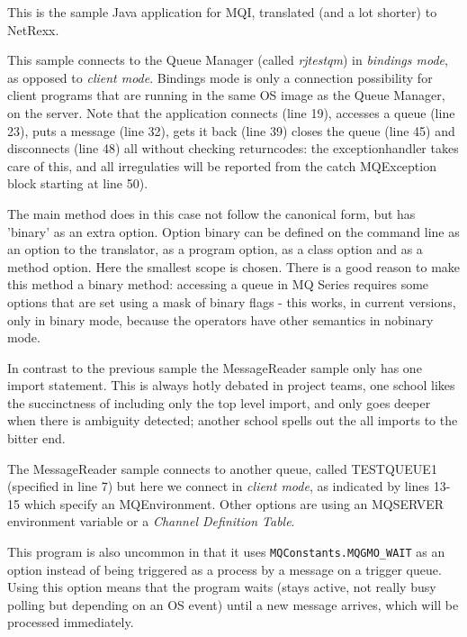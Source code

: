 {This is the sample Java application for MQI, translated (and a lot
shorter) to NetRexx.

This sample connects to the Queue Manager (called \emph{rjtestqm}) in
\emph{bindings mode}, as opposed to \emph{client mode}. Bindings mode
is only a connection possibility for client programs that are running
in the same OS image as the Queue Manager, on the server. Note that
the application connects (line 19), accesses a queue (line 23), puts a
message (line 32), gets it back (line 39) closes the queue (line 45) and disconnects (line 48) all without checking
returncodes: the exceptionhandler takes care of this, and all
irregulaties will be reported from the catch MQException block
starting at line 50).

The main method does in this case not follow the canonical form, but
has 'binary' as an extra option. Option binary can be defined on the
command line as an option to the translator, as a program option, as a
class option and as a method option. Here the smallest scope is
chosen. There is a good reason to make this method a binary method:
accessing a queue in MQ Series requires some options that are set
using a mask of binary flags - this works, in current \nr{} versions,
only in binary mode, because the operators have other semantics in
nobinary mode.


In contrast to the previous sample the MessageReader sample only has
one import statement. This is always hotly debated in project teams,
one school likes the succinctness of including only the top level
import, and only goes deeper when there is ambiguity detected; another
school spells out the all imports to the bitter end. 

The MessageReader sample connects to another queue, called TESTQUEUE1
(specified in line 7) but here we connect in \emph{client mode}, as
indicated by lines 13-15 which specify an MQEnvironment. Other
options are using an MQSERVER environment variable or a \emph{Channel
Definition Table}.

This program is also uncommon in that it uses
\texttt{MQConstants.MQGMO\_WAIT} as an option instead of being
triggered as a process by a message on a trigger queue. Using this
option means that the program waits (stays active, not really busy polling
but depending on an OS event) until a new
message arrives, which will be processed immediately.

}
